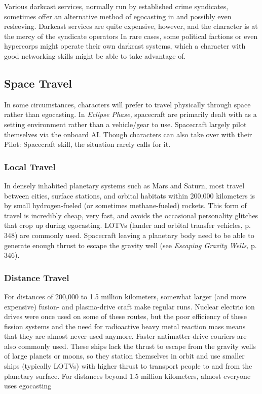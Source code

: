 Various darkcast services, normally run by established crime syndicates, sometimes offer an alternative method of egocasting in and possibly even resleeving. Darkcast services are quite expensive, however, and the character is at the mercy of the syndicate operators In rare cases, some political factions or even hypercorps might operate their own darkcast systems, which a character with good networking skills might be able to take advantage of. 

\subsection{Space Travel} 

In some circumstances, characters will prefer to travel physically through space rather than egocasting. In \textit{Eclipse Phase,} spacecraft are primarily dealt with as a setting environment rather than a vehicle/gear to use. Spacecraft largely pilot themselves via the onboard AI. Though characters can also take over with their Pilot: Spacecraft skill, the situation rarely calls for it. 

\subsubsection{Local Travel} 

In densely inhabited planetary systems such as Mars and Saturn, most travel between cities, surface stations, and orbital habitats within 200,000 kilometers is by small hydrogen-fueled (or sometimes methane-fueled) rockets. This form of travel is incredibly cheap, very fast, and avoids the occasional personality glitches that crop up during egocasting. LOTVs (lander and orbital transfer vehicles, p. 348) are commonly used. Spacecraft leaving a planetary body need to be able to generate enough thrust to escape the gravity well (see \textit{Escaping Gravity Wells,} p. 346). 

\subsubsection{Distance Travel} 

For distances of 200,000 to 1.5 million kilometers, somewhat larger (and more expensive) fusion- and plasma-drive craft make regular runs. Nuclear electric ion drives were once used on some of these routes, but the poor efficiency of these fission systems and the need for radioactive heavy metal reaction mass means that they are almost never used anymore. Faster antimatter-drive couriers are also commonly used. These ships lack the thrust to escape from the gravity wells of large planets or moons, so they station themselves in orbit and use smaller ships (typically LOTVs) with higher thrust to transport people to and from the planetary surface. For distances beyond 1.5 million kilometers, almost everyone uses egocasting 

